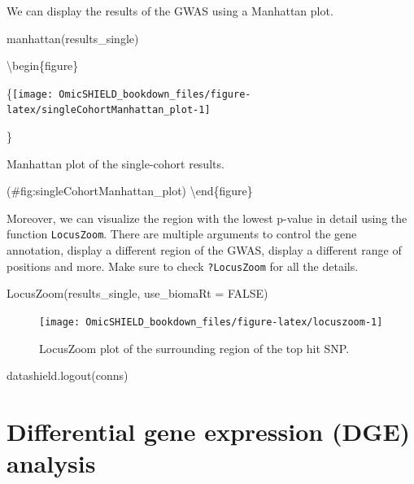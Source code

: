 \documentclass[
]{book}
\newenvironment{Shaded}{\begin{snugshade}}{\end{snugshade}}
\newcommand{\AttributeTok}[1]{\textcolor[rgb]{0.77,0.63,0.00}{#1}}
\newcommand{\ConstantTok}[1]{\textcolor[rgb]{0.00,0.00,0.00}{#1}}
\newcommand{\FunctionTok}[1]{\textcolor[rgb]{0.00,0.00,0.00}{#1}}
\newcommand{\NormalTok}[1]{#1}
\begin{document}
We can display the results of the GWAS using a Manhattan plot.

\begin{Shaded}
\begin{Highlighting}[]
\FunctionTok{manhattan}\NormalTok{(results\_single)}
\end{Highlighting}
\end{Shaded}

\textbackslash begin\{figure\}

\{\centering \texttt{[image: OmicSHIELD\_bookdown\_files/figure-latex/singleCohortManhattan\_plot-1]}

\}

\caption{Manhattan plot of the single-cohort results.}

(\#fig:singleCohortManhattan\_plot)
\textbackslash end\{figure\}

Moreover, we can visualize the region with the lowest p-value in detail using the function \texttt{LocusZoom}. There are multiple arguments to control the gene annotation, display a different region of the GWAS, display a different range of positions and more. Make sure to check \texttt{?LocusZoom} for all the details.

\begin{Shaded}
\begin{Highlighting}[]
\FunctionTok{LocusZoom}\NormalTok{(results\_single, }\AttributeTok{use\_biomaRt =} \ConstantTok{FALSE}\NormalTok{)}
\end{Highlighting}
\end{Shaded}

\begin{figure}

{\centering \texttt{[image: OmicSHIELD\_bookdown\_files/figure-latex/locuszoom-1]} 

}

\caption{LocusZoom plot of the surrounding region of the top hit SNP.}\label{fig:locuszoom}
\end{figure}

\begin{Shaded}
\begin{Highlighting}[]
\FunctionTok{datashield.logout}\NormalTok{(conns)}
\end{Highlighting}
\end{Shaded}

\hypertarget{differential-gene-expression-dge-analysis}{%
\chapter{Differential gene expression (DGE) analysis}\label{differential-gene-expression-dge-analysis}}
\end{document}
